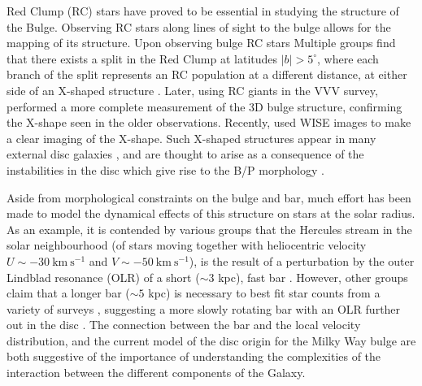 Red Clump (RC) stars have proved to be essential in studying the structure of the Bulge.  Observing RC stars along lines of sight to the bulge allows for the mapping of its structure. Upon observing bulge RC stars Multiple groups find that there exists a split in the Red Clump at latitudes $|b| > 5^{\circ}$, where each branch of the split represents an RC population at a different distance, at either side of an X-shaped structure \citep{2010ApJ...721L..28N,2010ApJ...724.1491M,2011AJ....142...76S}. Later, using RC giants in the VVV survey, \citet{2013MNRAS.435.1874W} performed a more complete measurement of the 3D bulge structure, confirming the X-shape seen in the older observations. Recently, \citet{2016AJ....152...14N} used WISE images to make a clear imaging of the X-shape. Such X-shaped structures appear in many external disc galaxies \citep[e.g.][]{2006MNRAS.370..753B}, and are thought to arise as a consequence of the instabilities in the disc which give rise to the B/P morphology \citep[based on studies of N-body simulations, e.g.][]{2005MNRAS.358.1477A,2006ApJ...645..209D}.

Aside from morphological constraints on the bulge and bar, much effort has been made to model the dynamical effects of this structure on stars at the solar radius. As an example, it is contended by various groups that the Hercules stream in the solar neighbourhood (of stars moving together with heliocentric velocity $U \sim -30\ \mathrm{km\ s^{-1}}$ and $V \sim -50\ \mathrm{km\ s^{-1}}$), is the result of a perturbation by the outer Lindblad resonance (OLR) of a short ($\sim 3$ kpc), fast bar \citep{2000AJ....119..800D,2014A&A...563A..60A,2017MNRAS.466L.113M}. However, other groups claim that a longer bar ($\sim 5$ kpc) is necessary to best fit star counts from a variety of surveys \citep{2015MNRAS.450.4050W}, suggesting a more slowly rotating bar with an OLR further out in the disc \citep[although see][for a reconciliation of Hercules with a long, slow bar]{2018MNRAS.477.3945H}. The connection between the bar and the local velocity distribution, and the current model of the disc origin for the Milky Way bulge are both suggestive of the importance of understanding the complexities of the interaction between the different components of the Galaxy.

